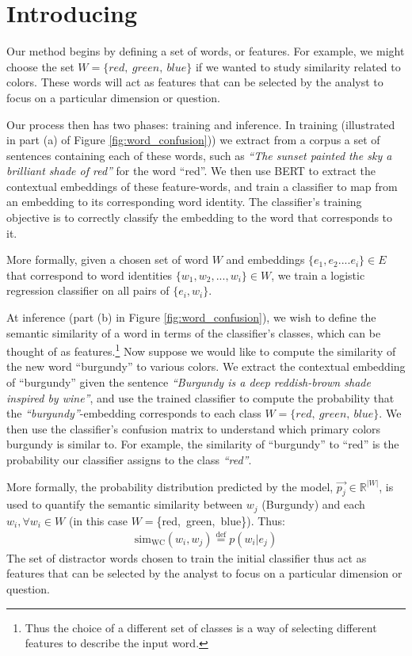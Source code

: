 \section{Introducing \wc}
\label{sec:identity_probe}


Our method begins by defining a set of words, or features. For example, we might choose the set $W=\{red,\ green,\ blue\}$ if we wanted to study similarity related to colors. These words will act as features that can be selected by the analyst to focus on a particular dimension or question.


Our process then has two phases: training and inference. In training (illustrated in part (a) of Figure \ref{fig:word_confusion})) we extract from a corpus a set of sentences containing each of these words, such as \textit{``The sunset painted the sky a brilliant shade of red''} for the word ``red''. We then use BERT to extract the contextual embeddings of these feature-words, and train a classifier to map from an embedding to its corresponding word identity. The classifier's training objective is to correctly classify the embedding to the word that corresponds to it. 

More formally, given a chosen set of word $W$ and embeddings $\{e_1, e_2 .... e_i\} \in E$ that correspond to word identities $\{w_1, w_2, ..., w_i\} \in W$, we train a logistic regression classifier on all pairs of $\{e_i, w_i\}$.

At inference (part (b) in Figure \ref{fig:word_confusion}), we wish to define the semantic similarity of a word in terms of the classifier's classes, which can be thought of as features.\footnote{Thus the choice of a different set of classes is a way of selecting different features  to describe the input word.} Now suppose we would like to compute the similarity of the new word ``burgundy'' to various colors. We extract the contextual embedding of  ``burgundy'' given the sentence \textit{``Burgundy is a deep reddish-brown shade inspired by wine''}, and  use the trained classifier to compute the probability that the \textit{``burgundy''}-embedding corresponds to each class $W=\{red,\ green,\ blue\}$. We then use the classifier's confusion matrix to understand which primary colors burgundy is similar to.  For example, the similarity of ``burgundy'' to  ``red'' is the probability our classifier assigns to the class \textit{``red''}.

More formally, the probability distribution predicted by the model, $\vec{p_j} \in \mathbb{R}^{|W|}$, is used to quantify the semantic similarity between $w_j$ (Burgundy) and each $w_i, \forall w_i \in W$ (in this case $W=$\{{red},\ green,\ blue\}).   Thus:
\begin{eqnarray}
\text{sim}_{\text{WC}}(w_i,w_j) \stackrel{\mathrm{def}}{=}
 p(w_i|e_j)
\end{eqnarray}
The set of distractor words chosen to train the initial classifier thus act as features that can be selected by the analyst to focus on a particular dimension or question.
 
